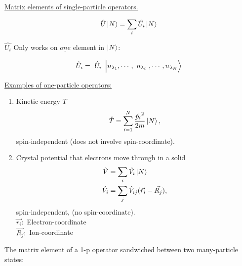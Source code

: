 \noindent \uline{Matrix elements of single-particle operators.}



\begin{equation*}
	\hat{U} \ket{N}= \sum_i \hat{U_i} \ket{N}
\end{equation*}

$\hat{U_i}$ Only works on $\underline{one}$ element in $\ket{N}$:




	

\begin{equation*}
	\hat{U}_i = \tikzmark{node1}{\hat{U}_i}\ket{n_{\lambda_1},\cdots, \tikzmark[black]{node2}{n_{\lambda_i}}, \cdots, n_{\lambda_N}} 
\end{equation*}
\linebreak


\noindent \uline{Examples of one-particle operators:}

\begin{enumerate}
	\item
		Kinetic energy $T$
		\begin{equation}
			\hat{T}= \sum_{i=1}^{N} \frac{\hat{p_i}^2}{2m} \ket{N},
		\end{equation}
		spin-independent (does not involve spin-coordinate).
	\item
		Crystal potential that electrons move through in a solid
		\begin{align}
			\hat{V} &= \sum_i \hat{V_i} \ket{N}\\
			\hat{V_i} &= \sum_j \hat{V}_{ij} (\vec{r_i}-\vec{R_j}),
		\end{align}
		spin-independent, (no spin-coordinate).\\
		$\vec{r_i}:$ Electron-coordinate\\
		$\vec{R_j}:$ Ion-coordinate
\end{enumerate}

\noindent The matrix element of a 1-p operator sandwiched between two many-particle states:


